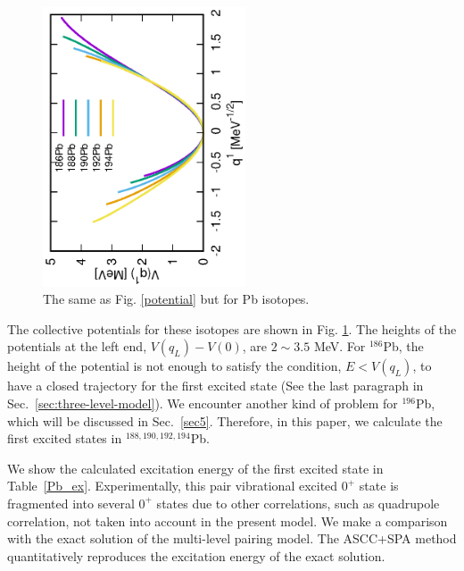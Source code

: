 \documentclass[%
superscriptaddress,
showpacs,
nofootinbib,
amsmath,amssymb,
aps,
prc,
twocolumn,
floatfix ]%
{revtex4-1}
\begin{document}
\begin{figure}[bt]
 \begin{center}
  \includegraphics[width=60mm,angle=-90]{Pbpotential.eps}
 \end{center}
	\caption{The same as Fig. \ref{potential} but for Pb isotopes.
}
 \label{Pb_potential}
\end{figure}
The collective potentials for these isotopes are shown
in Fig. \ref{Pb_potential}.
The heights of the potentials at the left end, $V(q_L)-V(0)$,
are $2\sim3.5$ MeV.
For $^{186}$Pb, the height of the potential is not
enough to satisfy the condition, $E<V(q_L)$,
to have a closed trajectory for the first excited state
(See the last paragraph in Sec.~\ref{sec:three-level-model}).
We encounter another kind of problem for $^{196}$Pb,
which will be discussed in Sec.~\ref{sec5}.
Therefore, in this paper, we calculate the first excited states
in $^{188,190,192,194}$Pb.


We show the calculated excitation energy of the first excited state
in Table~\ref{Pb_ex}.
Experimentally, this pair vibrational excited $0^+$ state is
fragmented into several $0^+$ states due to other correlations,
such as quadrupole correlation, not taken into account in the present model.
We make a comparison with the exact solution of the multi-level
pairing model.
The ASCC+SPA method quantitatively reproduces the excitation energy of
the exact solution.
\end{document}
